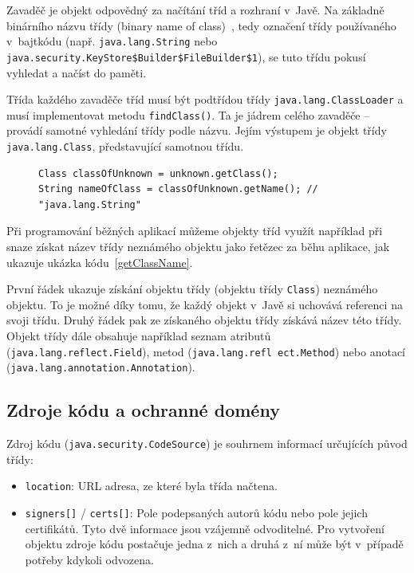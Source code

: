 Zavaděč je objekt odpovědný za načítání tříd a rozhraní v~Javě. Na základně binárního názvu třídy (binary name of class)~\cite{binaryNameOfClass}, tedy označení třídy používaného v~bajtkódu (např. {\tt java.lang.String} nebo {\tt java.security.KeyStore\$Builder\$FileBuilder\$1}), se tuto třídu pokusí vyhledat a načíst do paměti.~\cite{refClassLoader}

Třída každého zavaděče tříd musí být podtřídou třídy {\tt java.lang.ClassLoader} a musí implementovat metodu {\tt findClass()}. Ta je jádrem celého zavaděče -- provádí samotné vyhledání třídy podle názvu. Jejím výstupem je objekt třídy {\tt java.lang.Class}, představující samotnou třídu.~\cite{refClassLoader}

\begin{figure}[tbh]
\begin{lstlisting}[caption=Získávání názvu třídy neznámého objektu, label=getClassName]
Class classOfUnknown = unknown.getClass();
String nameOfClass = classOfUnknown.getName(); // "java.lang.String"
\end{lstlisting}
\end{figure}

Při programování běžných aplikací můžeme objekty tříd využít například při snaze získat název třídy neznámého objektu jako řetězec za běhu aplikace,
jak ukazuje ukázka kódu~\ref{getClassName}.

První řádek ukazuje získání objektu třídy (objektu třídy {\tt Class}) neznámého objektu.
To je možné díky tomu, že každý objekt v~Javě si uchovává referenci na svoji třídu.
Druhý řádek pak ze získaného objektu třídy získává název této třídy.
Objekt třídy dále obsahuje například seznam atributů ({\tt java.lang.reflect.Field}), metod ({\tt java.lang.refl ect.Method})
nebo anotací ({\tt java.lang.annotation.Annotation}).~\cite{sourceClass}

\subsection{Zdroje kódu a ochranné domény} \label{codeSourceAprotectionDomains}

Zdroj kódu ({\tt java.security.CodeSource}) je souhrnem informací určujících původ třídy:~\cite{sourceCodeSource}

\begin{itemize}
  \item {\tt location}: URL adresa, ze které byla třída načtena.
  \item {\tt signers[]} / {\tt certs[]}: Pole podepsaných autorů kódu nebo pole jejich certifikátů. Tyto dvě informace jsou vzájemně odvoditelné. Pro vytvoření objektu zdroje kódu postačuje jedna z~nich a druhá z~ní může být v~případě potřeby kdykoli odvozena.
\end{itemize}

